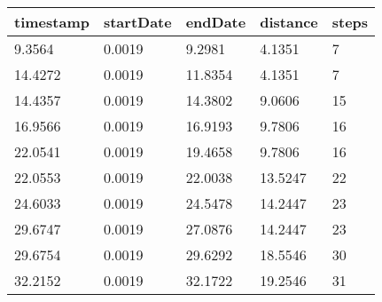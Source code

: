 \begin{tabular}{l|*{4}{l}}
timestamp & startDate & endDate & distance & steps\\
\hline
9.3564 & 0.0019 & 9.2981 & 4.1351 & 7\\
14.4272 & 0.0019 & 11.8354 & 4.1351 & 7\\
14.4357 & 0.0019 & 14.3802 & 9.0606 & 15\\
16.9566 & 0.0019 & 16.9193 & 9.7806 & 16\\
22.0541 & 0.0019 & 19.4658 & 9.7806 & 16\\
22.0553 & 0.0019 & 22.0038 & 13.5247 & 22\\
24.6033 & 0.0019 & 24.5478 & 14.2447 & 23\\
29.6747 & 0.0019 & 27.0876 & 14.2447 & 23\\
29.6754 & 0.0019 & 29.6292 & 18.5546 & 30\\
32.2152 & 0.0019 & 32.1722 & 19.2546 & 31\\
\end{tabular}
